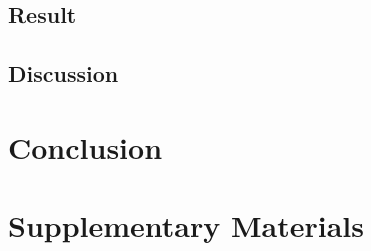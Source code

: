 \documentclass{book}
\newcommand{\beginsupplement}{%
	\setcounter{table}{0}
	\renewcommand{\thetable}{S\arabic{table}}%
	\setcounter{figure}{0}
	\renewcommand{\thefigure}{S\arabic{figure}}%
}
\begin{document}
	\section{Result}
	\section{Discussion}
	\chapter{Conclusion}
	
	
	
	
	
	
	
	
	\backmatter
	\printbibliography
	\chapter*{Supplementary Materials}
	\beginsupplement
\end{document}
